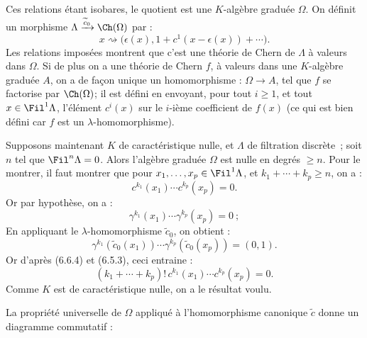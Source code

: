 
Ces
relations étant isobares, le quotient est une \(K\)-algèbre graduée \(\Omega\). On définit un morphisme \(\Lambda\xrightarrow{\widetilde c_0}\Ch(\Omega)\) par :
\[
  x\rightsquigarrow
  \bigl(\epsilon(x),1+c^1(x-\epsilon(x))+\cdots\bigr).
\]
Les relations imposées montrent que c'est une théorie de Chern de \(\Lambda\) à valeurs dans \(\Omega\). Si de plus on a une théorie de Chern \(f\), à valeurs dans une \(K\)-algèbre graduée \(A\), on a de façon unique un homomorphisme : \(\Omega\to A\), tel que \(f\) se factorise par \(\Ch(\Omega)\); il est défini en envoyant, pour tout \(i\ge1\), et tout \(x\in\Fil^1\Lambda\), l'élément \(c^i(x)\) sur le \(i\)-ième coefficient de \(f(x)\) (ce qui est bien défini car \(f\) est un \(\lambda\)-homomorphisme).

Supposons maintenant \(K\) de caractéristique nulle, et \(\Lambda\) de filtration discrète~; soit \(n\) tel que \(\Fil^n\Lambda=0\). Alors l'algèbre graduée \(\Omega\) est nulle en degrés \(\ge n\). Pour le montrer, il faut montrer que pour \(x_1,\ldots,x_p\in\Fil^1\Lambda\), et \(k_1+\cdots+k_p\ge n\), on a :
\[
  c^{k_1}(x_1)\cdots c^{k_p}(x_p)=0.
\]
Or par hypothèse, on a :
\[
  \gamma^{k_1}(x_1)\cdots\gamma^{k_p}(x_p)=0\ ;
\]
En appliquant le \(\lambda\)-homomorphisme \(\widetilde c_0\), on obtient :
\[
  \gamma^{k_1}(\widetilde c_0(x_1))\cdots
  \gamma^{k_p}(\widetilde c_0(x_p))=(0,1).
\]
Or d'après (6.6.4) et (6.5.3), ceci entraine :
\[
  (k_1+\cdots+k_p)!\,
  c^{k_1}(x_1)\cdots c^{k_p}(x_p)=0.
\]
Comme \(K\) est de caractéristique nulle, on a le résultat voulu.

La propriété universelle de \(\Omega\) appliqué à l'homomorphisme canonique \(\widetilde c\) donne un diagramme commutatif :
